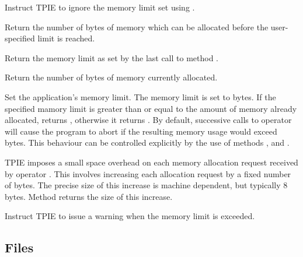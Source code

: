      {Instruct TPIE to
    ignore the memory limit set using .}

     {Return the number of
    bytes of memory which can be allocated before the user-specified limit
    is reached.}

     {Return the memory limit as
    set by the last call to method .}

     {Return the number of bytes
    of memory currently allocated.}

     {Set the
    application's memory limit. The memory limit is set to 
    bytes. If the specified mamory limit is greater than or equal to the
    amount of memory already allocated,  returns
    , otherwise it returns
    . By default, successive calls
    to operator  will cause the program to abort if the
    resulting memory usage would exceed  bytes. This behaviour
    can be controlled explicitly by the use of methods
    ,  and
    .}

     {TPIE imposes a small space
    overhead on each memory allocation request received by operator
    . This involves increasing each allocation request by a
    fixed number of bytes. The precise size of this increase is machine
    dependent, but typically 8 bytes. Method 
    returns the size of this increase.}

     {Instruct TPIE to
    issue a warning when the memory limit is exceeded.}

  \etabb
{}


\subsection{Files}
  \btabb
     {}
  \etabb


